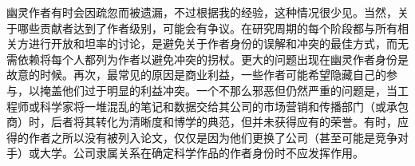 幽灵作者有时会因疏忽而被遗漏，不过根据我的经验，这种情况很少见。当然，关于哪些贡献者达到了作者级别，可能会有争议。在研究周期的每个阶段都与所有相关方进行开放和坦率的讨论，是避免关于作者身份的误解和冲突的最佳方式，而无需依赖将每个人都列为作者以避免冲突的拐杖。更大的问题出现在幽灵作者身份是故意的时候。再次，最常见的原因是商业利益，一些作者可能希望隐藏自己的参与，以掩盖他们过于明显的利益冲突。一个不那么邪恶但仍然严重的问题是，当工程师或科学家将一堆混乱的笔记和数据交给其公司的市场营销和传播部门（或承包商）时，后者将其转化为清晰度和博学的典范，但并未获得应有的荣誉。有时，应得的作者之所以没有被列入论文，仅仅是因为他们更换了公司（甚至可能是竞争对手）或大学。公司隶属关系在确定科学作品的作者身份时不应发挥作用。

